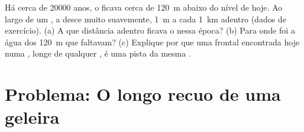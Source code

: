 \begin{exercise}[$\star\star\star$]\label{exo:g8:ice-on-earth:12}
Há cerca de \num{20000} anos, o  ficava cerca de \qty{120}{m} abaixo
do nível de hoje. Ao largo de um , a  desce
muito suavemente, \qty{1}{m} a cada \qty{1}{km}  adentro (dados de
exercício). (a) A que distância  adentro ficava o  nessa época?
(b) Para onde foi a água dos \qty{120}{m} que faltavam? (c) Explique por
que uma  frontal encontrada hoje numa , longe de qualquer
, é uma pista da mesma .
\end{exercise}

\section{Problema: O longo recuo de uma geleira}

